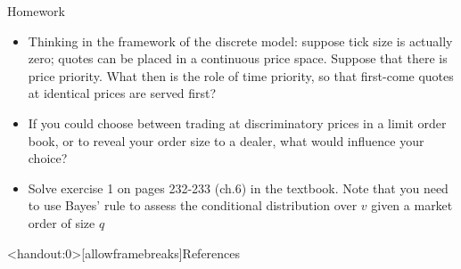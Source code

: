 \documentclass[english,10pt
,aspectratio=169
]{beamer}
\begin{document}
\begin{frame}{Homework}
	\begin{itemize}
		\item Thinking in the framework of the discrete model: suppose tick size is actually zero; quotes can be placed in a continuous price space. Suppose that there is price priority. What then is the role of time priority, so that first-come quotes at identical prices are served first?
		\item If you could choose between trading at discriminatory prices in a limit order book, or to reveal your order size to a dealer, what would influence your choice?
		\item Solve exercise 1 on pages 232-233 (ch.6) in the textbook. Note that you need to use Bayes' rule to assess the conditional distribution over $v$ given a market order of size $q$
	\end{itemize}
\end{frame}





\appendix
\begin{frame}<handout:0>[allowframebreaks]{References}
	
	
\end{frame}
\end{document}
